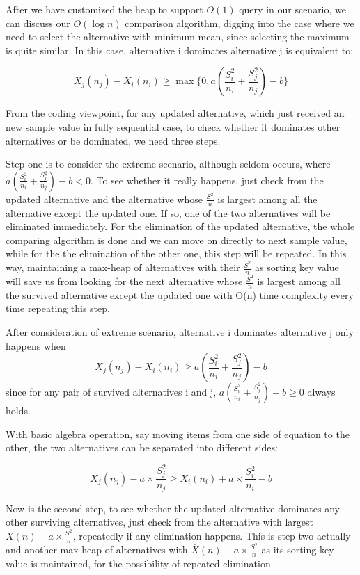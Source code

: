 After we have customized the heap to support $O(1)$ query in our scenario, we can discuss our $O(\log{n})$ comparison algorithm, digging into the case where we need to select the alternative with minimum mean, since selecting the maximum is quite similar. In this case, alternative i dominates alternative j is equivalent to:

$$ \bar{X}_j(n_j)-\bar{X}_i(n_i) \ge \max\{0,a(\frac{S_i^2}{n_i}+\frac{S_j^2}{n_j}) - b\} $$

From the coding viewpoint, for any updated alternative, which just received an new sample value in fully sequential case, to check whether it dominates other alternatives or be dominated, we need three steps.

Step one is to consider the extreme scenario, although seldom occurs, where $a(\frac{S_i^2}{n_i}+\frac{S_j^2}{n_j}) - b < 0$. To see whether it really happens, just check from the updated alternative and the alternative whose $\frac{S^2}{n}$ is largest among all the alternative except the updated one. If so, one of the two alternatives will be eliminated immediately. For the elimination of the updated alternative, the whole comparing algorithm is done and we can move on directly to next sample value, while for the the elimination of the other one, this step will be repeated. In this way, maintaining a max-heap of alternatives with their $\frac{S^2}{n}$ as sorting key value will save us from looking for the next alternative whose $\frac{S^2}{n}$ is largest among all the survived alternative except the updated one with O(n) time complexity every time repeating this step.

After consideration of extreme scenario, alternative i dominates alternative j only happens when
$$ \bar{X}_j(n_j)-\bar{X}_i(n_i) \ge a(\frac{S_i^2}{n_i}+\frac{S_j^2}{n_j}) - b $$
since for any pair of survived alternatives i and j, $a(\frac{S_i^2}{n_i}+\frac{S_j^2}{n_j}) - b \ge 0$ always holds.

With basic algebra operation, say moving items from one side of equation to the other, the two alternatives can be separated into different sides:

$$ \bar{X}_j(n_j) - a \times \frac{S_j^2}{n_j} \ge \bar{X}_i(n_i) + a \times \frac{S_i^2}{n_i} - b $$

Now is the second step, to see whether the updated alternative dominates any other surviving alternatives, just check from the alternative with largest $\bar{X}(n) - a \times \frac{S^2}{n}$, repeatedly if any elimination happens. This is step two actually and another max-heap of alternatives with $\bar{X}(n) - a \times \frac{S^2}{n}$ as its sorting key value is maintained, for the possibility of repeated elimination.

